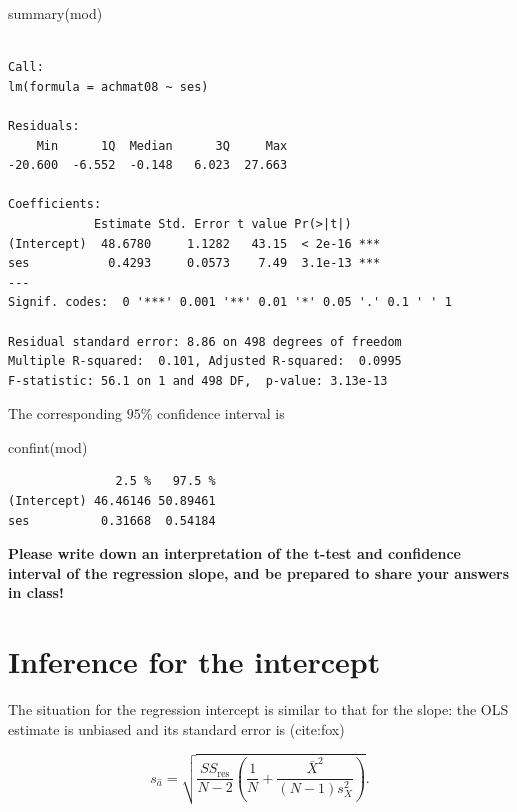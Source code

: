 \documentclass[
  letterpaper,
  DIV=11,
  numbers=noendperiod]{scrreprt}
\newenvironment{Shaded}{\begin{snugshade}}{\end{snugshade}}
\newcommand{\FunctionTok}[1]{\textcolor[rgb]{0.28,0.35,0.67}{#1}}
\newcommand{\NormalTok}[1]{\textcolor[rgb]{0.00,0.23,0.31}{#1}}
\begin{document}
\begin{Shaded}
\begin{Highlighting}[]
\FunctionTok{summary}\NormalTok{(mod)}
\end{Highlighting}
\end{Shaded}

\begin{verbatim}

Call:
lm(formula = achmat08 ~ ses)

Residuals:
    Min      1Q  Median      3Q     Max 
-20.600  -6.552  -0.148   6.023  27.663 

Coefficients:
            Estimate Std. Error t value Pr(>|t|)    
(Intercept)  48.6780     1.1282   43.15  < 2e-16 ***
ses           0.4293     0.0573    7.49  3.1e-13 ***
---
Signif. codes:  0 '***' 0.001 '**' 0.01 '*' 0.05 '.' 0.1 ' ' 1

Residual standard error: 8.86 on 498 degrees of freedom
Multiple R-squared:  0.101, Adjusted R-squared:  0.0995 
F-statistic: 56.1 on 1 and 498 DF,  p-value: 3.13e-13
\end{verbatim}

The corresponding \(95\%\) confidence interval is

\begin{Shaded}
\begin{Highlighting}[]
\FunctionTok{confint}\NormalTok{(mod)}
\end{Highlighting}
\end{Shaded}

\begin{verbatim}
               2.5 %   97.5 %
(Intercept) 46.46146 50.89461
ses          0.31668  0.54184
\end{verbatim}

\textbf{Please write down an interpretation of the t-test and confidence
interval of the regression slope, and be prepared to share your answers
in class!}

\hypertarget{inference-for-intercept-2}{%
\section{Inference for the intercept}\label{inference-for-intercept-2}}

The situation for the regression intercept is similar to that for the
slope: the OLS estimate is unbiased and its standard error is (cite:fox)

\[ 
s_{\widehat a} = \sqrt{\frac{SS_{\text{res}}}{N-2} \left(\frac{1}{N} + \frac{\bar X^2}{(N-1)s^2_X}\right)}.
\]
\end{document}
